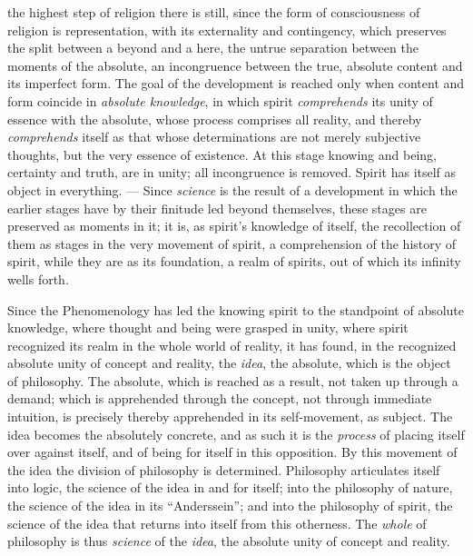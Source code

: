 the highest step of religion there is still, since the form of
consciousness of religion is representation, with its externality and
contingency, which preserves the split between a beyond and a here, the
untrue separation between the moments of the absolute, an incongruence
between the true, absolute content and its imperfect form. The goal of
the development is reached only when content and form coincide in
\emph{absolute knowledge}, in which spirit \emph{comprehends}
its unity of essence with the absolute, whose process comprises all
reality, and thereby \emph{comprehends} itself as that whose
determinations are not merely subjective thoughts, but the very essence
of existence. At this stage knowing and being, certainty and truth, are
in unity; all incongruence is removed. Spirit has itself as object in
everything. --- Since \emph{science} is the result of a development in
which the earlier stages have by their finitude led beyond themselves,
these stages are preserved as moments in it; it is, as spirit's
knowledge of itself, the recollection of them as stages in the very
movement of spirit, a comprehension of the history of spirit, while they
are as its foundation, a realm of spirits, out of which its infinity
wells forth.

\divrule

Since the Phenomenology has led the knowing spirit to the standpoint of
absolute knowledge, where thought and being were grasped in unity, where
spirit recognized its realm in the whole world of reality, it has found,
in the recognized absolute unity of concept and reality, the
\emph{idea}, the absolute, which is the object of philosophy. The
absolute, which is reached as a result, not taken up through a demand;
which is apprehended through the concept, not through immediate
intuition, is precisely thereby apprehended in its self-movement, as
subject. The idea becomes the absolutely concrete, and as such it is the
\emph{process} of placing itself over against itself, and of being for
itself in this opposition. By this movement of the idea the division of
philosophy is determined. Philosophy articulates itself into logic, the
science of the idea in and for itself; into the philosophy of nature,
the science of the idea in its ``Anderssein''; and into the philosophy
of spirit, the science of the idea that returns into itself from this
otherness. The \emph{whole} of philosophy is thus \emph{science} of the
\emph{idea}, the absolute unity of concept and reality.

